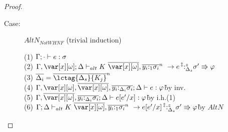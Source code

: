 \begin{proof}
\begin{description}
\item[Case:] $AltN_{Not WHNF}$ (trivial induction)
\begin{tabbing}
    (1) $\Gamma; \cdot \vdash e : \sigma$\\
    (2) $\G,\xo;\D \vdash_{alt} \konstructor~\to e \prescript{\ddag}{}{:^z_{\D_s}} \s' \Rrightarrow \vp$\\
    (3) $\ov{\D_i} = \ov{\lctag{\D_s}{K_j}}^n$\\
    (4) $\G,\xo,\ov{\xo},\ov{y_i{:}_{\D_i}\s_i}; \D \vdash e : \vp $\` by inv.\\
    (5) $\G,\ov{\xo},\ov{y_i{:}_{\D_i}\s_i}; \D \vdash e[e'/x] : \vp $\` by i.h.(1)\\
    (6) $\G;\D \vdash_{alt} \konstructor~\to e[e'/x] \prescript{\ddag}{}{:^z_{\D_s}} \s' \Rrightarrow \vp$\` by $AltN$\\
\end{tabbing}



\end{description}
\end{proof}
